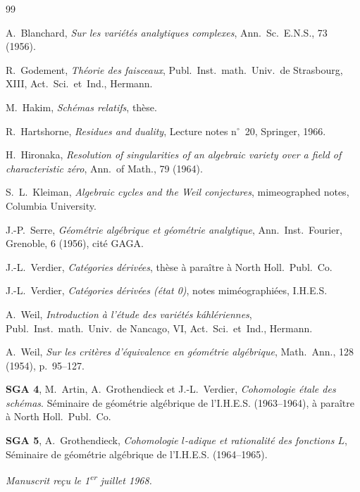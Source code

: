 \documentclass[12pt]{amsart}
\theoremstyle{plain}
\theoremstyle{remark}
\begin{document}
\begin{thebibliography}{99}

A.~Blanchard, \textit{Sur les vari\'et\'es analytiques complexes}, Ann.~Sc.~E.N.S., 73 (1956).

R.~Godement, \textit{Th\'eorie des faisceaux}, Publ.~Inst.~math.~Univ.~de Strasbourg, XIII, Act.~Sci.~et~Ind., Hermann.

M.~Hakim, \textit{Sch\'emas relatifs}, th\`ese.

R.~Hartshorne, \textit{Residues and duality}, Lecture notes n${}^\circ$~20, Springer, 1966.

H.~Hironaka, \textit{Resolution of singularities of an algebraic variety over a field of characteristic z\'ero}, Ann.~of Math., 79 (1964).

S.~L.~Kleiman, \textit{Algebraic cycles and the Weil conjectures}, mimeographed notes, Columbia University.

J.-P.~Serre, \textit{G\'eom\'etrie alg\'ebrique et g\'eom\'etrie analytique}, Ann.~Inst.~Fourier, Grenoble, 6 (1956), cit\'e GAGA.

J.-L.~Verdier, \textit{Cat\'egories d\'eriv\'ees}, th\`ese \`a para\^itre \`a North Holl.~Publ.~Co.

J.-L.~Verdier, \textit{Cat\'egories d\'eriv\'ees (\'etat 0)}, notes mim\'eographi\'ees, I.H.E.S.

A.~Weil, \textit{Introduction \`a l'\'etude des vari\'et\'es k\'ahl\'eriennes}, Publ.~Inst.~math.~Univ.~de Nancago, VI, Act.~Sci.~et~Ind., Hermann.

A.~Weil, \textit{Sur les crit\`eres d'\'equivalence en g\'eom\'etrie alg\'ebrique}, Math.~Ann., 128 (1954), p.~95--127.

\textbf{SGA 4}, M.~Artin, A.~Grothendieck et J.-L.~Verdier, \textit{Cohomologie \'etale des sch\'emas}. S\'eminaire de g\'eom\'etrie alg\'ebrique de l'I.H.E.S. (1963--1964), \`a para\^itre \`a North Holl.~Publ.~Co.

\textbf{SGA 5}, A.~Grothendieck, \textit{Cohomologie $l$-adique et rationalit\'e des fonctions $L$}, S\'eminaire de g\'eom\'etrie alg\'ebrique de l'I.H.E.S. (1964--1965).

\end{thebibliography}

\vspace{1cm}
\noindent \textit{Manuscrit re\c{c}u le 1\textsuperscript{er} juillet 1968.}
\end{document}
